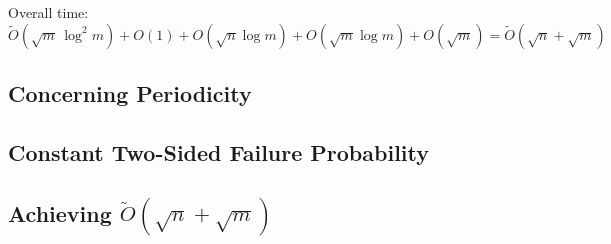 \documentclass[12pt]{IEEEtran}
\begin{document}
Overall time: \(\widetilde O(\sqrt{m}\,\log^2 m) + O(1) + O(\sqrt{n} \log m) + O(\sqrt{m} \log m) + O(\sqrt{m}) = \widetilde{O}(\sqrt{n} + \sqrt{m})\)

\subsection{Concerning Periodicity}

\subsection{Constant Two-Sided Failure Probability}
\subsection{Achieving \texorpdfstring{$\tilde{O}(\sqrt{n} + \sqrt{m})$}{O(sqrt(n)+sqrt(m))}}



\end{document}
